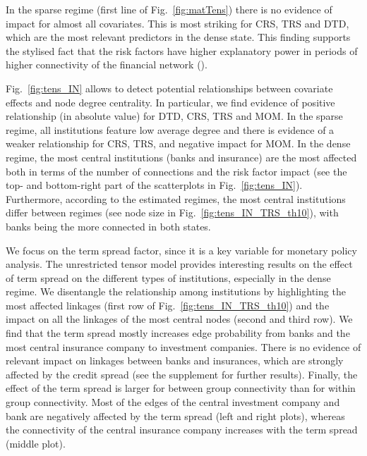 \documentclass[12pt,a4paper]{article}
\theoremstyle{custom}
\begin{document}
In the sparse regime (first line of Fig.~\ref{fig:matTens}) there is no evidence of impact for almost all covariates. This is most striking for CRS, TRS and DTD, which are the most relevant predictors in the dense state. This finding supports the stylised fact that the risk factors have higher explanatory power in periods of higher connectivity of the financial network (\cite{Billioetal12GrangerNet}).

Fig.~\ref{fig:tens_IN} allows to detect potential relationships between covariate effects and node degree centrality. In particular, we find evidence of positive relationship (in absolute value) for DTD, CRS, TRS and MOM.
In the sparse regime, all institutions feature low average degree and there is evidence of a weaker relationship for CRS, TRS, and negative impact for MOM. In the dense regime, the most central institutions (banks and insurance) are the most affected both in terms of the number of connections and the risk factor impact (see the top- and bottom-right part of the scatterplots in Fig.~\ref{fig:tens_IN}). Furthermore, according to the estimated regimes, the most central institutions differ between regimes (see node size in Fig.~\ref{fig:tens_IN_TRS_th10}), with banks being the more connected in both states.

We focus on the term spread factor, since it is a key variable for monetary policy analysis. The unrestricted tensor model provides interesting results on the effect of term spread on the different types of institutions, especially in the dense regime.
We disentangle the relationship among institutions by highlighting the most affected linkages (first row of Fig.~\ref{fig:tens_IN_TRS_th10}) and the impact on all the linkages of the most central nodes (second and third row).
We find that the term spread mostly increases edge probability from banks and the most central insurance company to investment companies. There is no evidence of relevant impact on linkages between banks and insurances, which are strongly affected by the credit spread (see the supplement for further results).
Finally, the effect of the term spread is larger for between group connectivity than for within group connectivity. Most of the edges of the central investment company and bank are negatively affected by the term spread (left and right plots), whereas the connectivity of the central insurance company increases with the term spread (middle plot).
\end{document}

